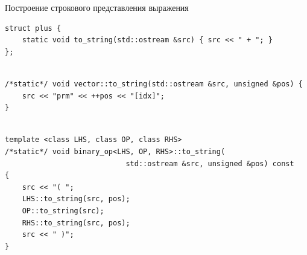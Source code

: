 \documentclass[@BEAMER_OPTIONS@]{beamer}
\begin{document}
\note{ }

\begin{frame}[fragile]{Построение строкового представления выражения}
    \begin{exampleblock}{}
        \begin{lstlisting}
struct plus {
    static void to_string(std::ostream &src) { src << " + "; }
};
        \end{lstlisting}
        \pause
        \begin{lstlisting}[firstnumber=last]

/*static*/ void vector::to_string(std::ostream &src, unsigned &pos) {
    src << "prm" << ++pos << "[idx]";
}
        \end{lstlisting}
        \pause
        \begin{lstlisting}[firstnumber=last]

template <class LHS, class OP, class RHS>
/*static*/ void binary_op<LHS, OP, RHS>::to_string(
                            std::ostream &src, unsigned &pos) const
{
    src << "( ";
    LHS::to_string(src, pos);
    OP::to_string(src);
    RHS::to_string(src, pos);
    src << " )";
}
        \end{lstlisting}
    \end{exampleblock}
\end{frame}

\end{document}
